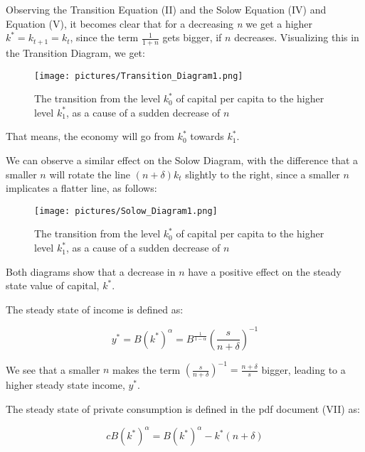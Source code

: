 \documentclass[11pt]{article} %
\begin{document}
Observing the Transition Equation (II) and the Solow Equation (IV) and Equation (V), it becomes clear that for a decreasing \textit{n} we get a higher $k^* = k_{t+1} = k_t$, since the term $\frac{1}{1+n}$ gets bigger, if $n$ decreases. Visualizing this in the Transition Diagram, we get:\par
\begin{figure}[h!]
    \centering
    \texttt{[image: pictures/Transition\_Diagram1.png]}
    \caption{The transition from the level $k_0^*$ of capital per capita to the higher level $k_1^*$, as a cause of a sudden decrease of $n$}
    \label{fig:Transition_Diagram1}
\end{figure}
That means, the economy will go from $k_0^*$ towards $k_1^*$.\par

We can observe a similar effect on the Solow Diagram, with the difference that a smaller $n$ will rotate the line $(n+\delta)k_t$ slightly to the right, since a smaller $n$ implicates a flatter line, as follows:\par

\begin{figure}[h!]
    \centering
    \texttt{[image: pictures/Solow\_Diagram1.png]}
    \caption{The transition from the level $k_0^*$ of capital per capita to the higher level $k_1^*$, as a cause of a sudden decrease of $n$}
    \label{fig:Transition_Diagram1}
\end{figure}

Both diagrams show that a decrease in $n$ have a positive effect on the steady state value of capital, $k^*$. \par

The steady state of income is defined as:\par

\begin{equation}
    y^*=B(k^*)^\alpha=B^{\frac{1}{1-\alpha}}(\frac{s}{n+\delta})^{-1}
\end{equation}

We see that a smaller $n$ makes the term ${(\frac{s}{n+\delta})}^{-1} = \frac{n+\delta}{s}$ bigger, leading to a higher steady state income, $y^*$.\par

The steady state of private consumption is defined in the pdf document (VII) as:\par

\begin{equation}
    cB({k^*})^\alpha=B({k^*})^\alpha-k^*(n+\delta)
\end{equation}
\end{document}
